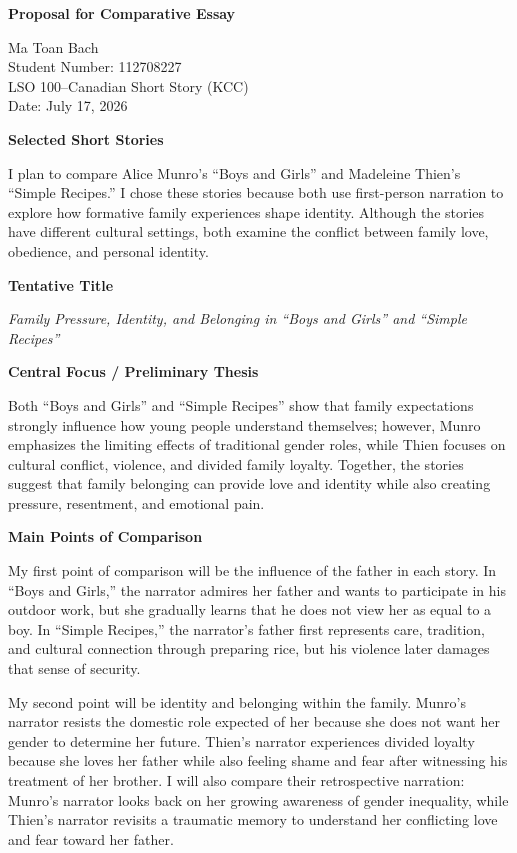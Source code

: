 \documentclass[12pt]{article}
\begin{document}
\begin{center}
\textbf{Proposal for Comparative Essay}
\end{center}

Ma Toan Bach\\
Student Number: 112708227\\
LSO 100--Canadian Short Story (KCC)\\
Date: July 17, 2026

\vspace{0.5em}
\textbf{Selected Short Stories}

I plan to compare Alice Munro's ``Boys and Girls'' and Madeleine Thien's ``Simple Recipes.'' I chose these stories because both use first-person narration to explore how formative family experiences shape identity. Although the stories have different cultural settings, both examine the conflict between family love, obedience, and personal identity.

\textbf{Tentative Title}

\textit{Family Pressure, Identity, and Belonging in ``Boys and Girls'' and ``Simple Recipes''}

\textbf{Central Focus / Preliminary Thesis}

Both ``Boys and Girls'' and ``Simple Recipes'' show that family expectations strongly influence how young people understand themselves; however, Munro emphasizes the limiting effects of traditional gender roles, while Thien focuses on cultural conflict, violence, and divided family loyalty. Together, the stories suggest that family belonging can provide love and identity while also creating pressure, resentment, and emotional pain.

\textbf{Main Points of Comparison}

My first point of comparison will be the influence of the father in each story. In ``Boys and Girls,'' the narrator admires her father and wants to participate in his outdoor work, but she gradually learns that he does not view her as equal to a boy. In ``Simple Recipes,'' the narrator's father first represents care, tradition, and cultural connection through preparing rice, but his violence later damages that sense of security.

My second point will be identity and belonging within the family. Munro's narrator resists the domestic role expected of her because she does not want her gender to determine her future. Thien's narrator experiences divided loyalty because she loves her father while also feeling shame and fear after witnessing his treatment of her brother. I will also compare their retrospective narration: Munro's narrator looks back on her growing awareness of gender inequality, while Thien's narrator revisits a traumatic memory to understand her conflicting love and fear toward her father.
\end{document}
